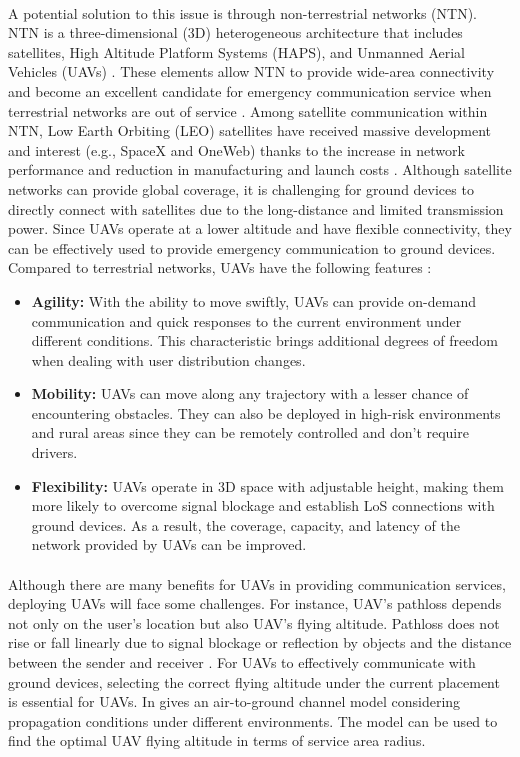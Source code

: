 \documentclass[a4paper,12pt]{report}
\begin{document}
\paragraph{}
A potential solution to this issue is through non-terrestrial networks (NTN). NTN is a three-dimensional (3D) heterogeneous architecture that includes satellites, High Altitude Platform Systems (HAPS), and Unmanned Aerial Vehicles (UAVs) \cite{b3}. These elements allow NTN to provide wide-area connectivity and become an excellent candidate for emergency communication service when terrestrial networks are out of service \cite{b4}. Among satellite communication within NTN, Low Earth Orbiting (LEO) satellites have received massive development and interest (e.g., SpaceX and OneWeb) thanks to the increase in network performance and reduction in manufacturing and launch costs \cite{b5}. Although satellite networks can provide global coverage, it is challenging for ground devices to directly connect with satellites due to the long-distance and limited transmission power. Since UAVs operate at a lower altitude and have flexible connectivity, they can be effectively used to provide emergency communication to ground devices. Compared to terrestrial networks, UAVs have the following features \cite{b6}:
\begin{itemize}
    \item \textbf{Agility:} With the ability to move swiftly, UAVs can provide on-demand communication and quick responses to the current environment under different conditions. This characteristic brings additional degrees of freedom when dealing with user distribution changes.
    \item \textbf{Mobility:} UAVs can move along any trajectory with a lesser chance of encountering obstacles. They can also be deployed in high-risk environments and rural areas since they can be remotely controlled and don't require drivers.
    \item \textbf{Flexibility:} UAVs operate in 3D space with adjustable height, making them more likely to overcome signal blockage and establish LoS connections with ground devices. As a result, the coverage, capacity, and latency of the network provided by UAVs can be improved.
\end{itemize}
\paragraph{}
Although there are many benefits for UAVs in providing communication services, deploying UAVs will face some challenges. For instance, UAV's pathloss depends not only on the user's location but also UAV's flying altitude. Pathloss does not rise or fall linearly due to signal blockage or reflection by objects and the distance between the sender and receiver \cite{b7}. For UAVs to effectively communicate with ground devices, selecting the correct flying altitude under the current placement is essential for UAVs. In \cite{b8} gives an air-to-ground channel model considering propagation conditions under different environments. The model can be used to find the optimal UAV flying altitude in terms of service area radius.
\end{document}
